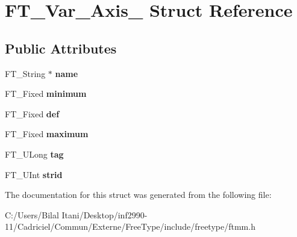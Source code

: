 \hypertarget{struct_f_t___var___axis__}{}\section{F\+T\+\_\+\+Var\+\_\+\+Axis\+\_\+ Struct Reference}
\label{struct_f_t___var___axis__}
\subsection*{Public Attributes}
\begin{DoxyCompactItemize}
\item 
F\+T\+\_\+\+String $\ast$ {\bfseries name}\hypertarget{struct_f_t___var___axis___a8d0e0af322a692999ec3733a3e18a5a4}{}\label{struct_f_t___var___axis___a8d0e0af322a692999ec3733a3e18a5a4}

\item 
F\+T\+\_\+\+Fixed {\bfseries minimum}\hypertarget{struct_f_t___var___axis___aae13a8dea1c96bc3949019e8117e7edb}{}\label{struct_f_t___var___axis___aae13a8dea1c96bc3949019e8117e7edb}

\item 
F\+T\+\_\+\+Fixed {\bfseries def}\hypertarget{struct_f_t___var___axis___a37a6ca4188a6bfd95d9d06538bf1a3dd}{}\label{struct_f_t___var___axis___a37a6ca4188a6bfd95d9d06538bf1a3dd}

\item 
F\+T\+\_\+\+Fixed {\bfseries maximum}\hypertarget{struct_f_t___var___axis___a5704641439e9f318cf3c2b73864e3260}{}\label{struct_f_t___var___axis___a5704641439e9f318cf3c2b73864e3260}

\item 
F\+T\+\_\+\+U\+Long {\bfseries tag}\hypertarget{struct_f_t___var___axis___a01ef9396e34e740c2d2b8c7117094624}{}\label{struct_f_t___var___axis___a01ef9396e34e740c2d2b8c7117094624}

\item 
F\+T\+\_\+\+U\+Int {\bfseries strid}\hypertarget{struct_f_t___var___axis___a297d28ab0f5666e56d7575249ccc75d7}{}\label{struct_f_t___var___axis___a297d28ab0f5666e56d7575249ccc75d7}

\end{DoxyCompactItemize}


The documentation for this struct was generated from the following file\+:\begin{DoxyCompactItemize}
\item 
C\+:/\+Users/\+Bilal Itani/\+Desktop/inf2990-\/11/\+Cadriciel/\+Commun/\+Externe/\+Free\+Type/include/freetype/ftmm.\+h\end{DoxyCompactItemize}
